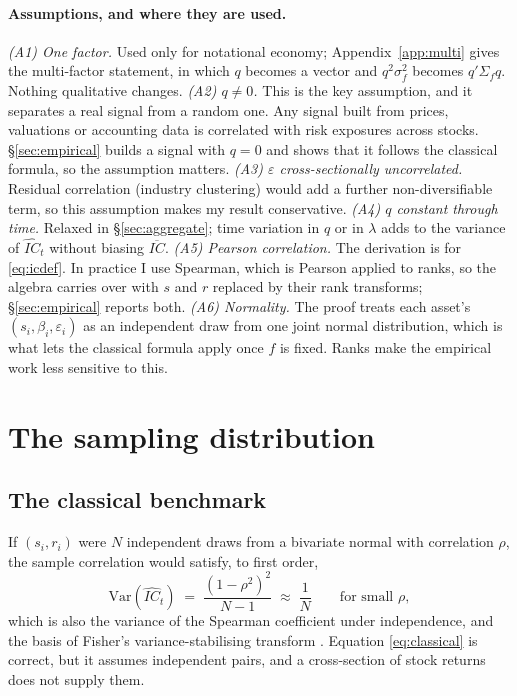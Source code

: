 \documentclass[11pt,a4paper]{article}
\newcommand{\ICh}{\widehat{IC}}
\begin{document}
\paragraph{Assumptions, and where they are used.}
\emph{(A1) One factor.} Used only for notational economy; Appendix~\ref{app:multi} gives
the multi-factor statement, in which $q$ becomes a vector and $q^2\sigma_f^2$ becomes
$q'\Sigma_f q$. Nothing qualitative changes.
\emph{(A2) $q \neq 0$.} This is the key assumption, and it separates a real signal from a random one. Any signal built from prices, valuations or
accounting data is correlated with risk exposures across stocks. \S\ref{sec:empirical}
builds a signal with $q = 0$ and shows that it follows the classical formula, so the
assumption matters.
\emph{(A3) $\varepsilon$ cross-sectionally uncorrelated.} Residual correlation (industry
clustering) would add a further non-diversifiable term, so this assumption makes my
result conservative.
\emph{(A4) $q$ constant through time.} Relaxed in \S\ref{sec:aggregate}; time variation
in $q$ or in $\lambda$ adds to the variance of $\ICh_t$ without biasing $\overline{IC}$.
\emph{(A5) Pearson correlation.} The derivation is for \eqref{eq:icdef}. In practice I
use Spearman, which is Pearson applied to ranks, so the algebra carries over with $s$ and
$r$ replaced by their rank transforms; \S\ref{sec:empirical} reports both.
\emph{(A6) Normality.} The proof treats each asset's $(s_i, \beta_i, \varepsilon_i)$ as
an independent draw from one joint normal distribution, which is what lets the classical
formula apply once $f$ is fixed. Ranks make the empirical work less sensitive to this.

\section{The sampling distribution}\label{sec:derivation}

\subsection{The classical benchmark}

If $(s_i, r_i)$ were $N$ independent draws from a bivariate normal with correlation
$\rho$, the sample correlation would satisfy, to first order,
\begin{equation}
\mathrm{Var}(\ICh_t) \;=\; \frac{(1-\rho^2)^2}{N-1} \;\approx\; \frac{1}{N}
\qquad\text{for small } \rho,
\label{eq:classical}
\end{equation}
which is also the variance of the Spearman coefficient under independence, and the basis
of Fisher's variance-stabilising transform \citep{fisher1921correlation}. Equation
\eqref{eq:classical} is correct, but it assumes independent pairs, and a cross-section
of stock returns does not supply them.
\end{document}

